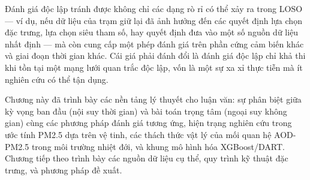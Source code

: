 Đánh giá độc lập tránh được không chỉ các dạng rò rỉ có thể xảy ra trong LOSO --- ví dụ, nếu dữ liệu của trạm giữ lại đã ảnh hưởng đến các quyết định lựa chọn đặc trưng, lựa chọn siêu tham số, hay quyết định đưa vào một số nguồn dữ liệu nhất định --- mà còn cung cấp một phép đánh giá trên phần cứng cảm biến khác và giai đoạn thời gian khác. Cái giá phải đánh đổi là đánh giá độc lập chỉ khả thi khi tồn tại một mạng lưới quan trắc độc lập, vốn là một sự xa xỉ thực tiễn mà ít nghiên cứu có thể tận dụng.


Chương này đã trình bày các nền tảng lý thuyết cho luận văn: sự phân biệt giữa kỳ vọng ban đầu (nội suy thời gian) và bài toán trọng tâm (ngoại suy không gian) cùng các phương pháp đánh giá tương ứng, hiện trạng nghiên cứu trong ước tính PM2.5 dựa trên vệ tinh, các thách thức vật lý của mối quan hệ AOD-PM2.5 trong môi trường nhiệt đới, và khung mô hình hóa XGBoost/DART. Chương tiếp theo trình bày các nguồn dữ liệu cụ thể, quy trình kỹ thuật đặc trưng, và phương pháp đề xuất.
